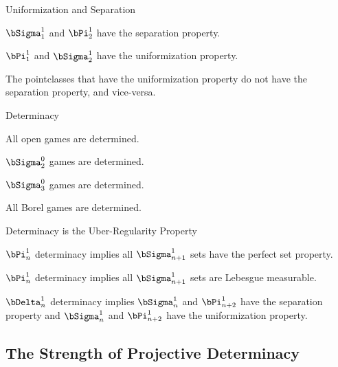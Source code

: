 \documentclass{beamer}
\begin{document}
\begin{frame}{Uniformization and Separation}

\begin{theorem}[Luzin, 1927]
$\bSigma^1_1$ and $\bPi^1_2$ have the separation property.
\end{theorem}


\begin{theorem}[Kondo, 1939]
$\bPi^1_1$ and $\bSigma^1_2$ have the uniformization property.
\end{theorem}

\begin{fact}
The pointclasses that have the uniformization property do not have the
separation property, and vice-versa.
\end{fact}

\end{frame}

\begin{frame}{Determinacy}

\begin{theorem}
All open games are determined.
\end{theorem}

\begin{theorem}[Wolf, 1955]
$\bSigma^0_2$ games are determined.
\end{theorem}

\begin{theorem}[Davis, 1964]
$\bSigma^0_3$ games are determined.
\end{theorem}

\begin{theorem}[Matin, 1975]
All Borel games are determined.
\end{theorem}

\end{frame}


\begin{frame}{Determinacy is the Uber-Regularity Property}

\begin{theorem}
$\bPi^1_n$ determinacy implies all $\bSigma^1_{n+1}$ sets have the perfect set
property.
\end{theorem}

\begin{theorem}
$\bPi^1_n$ determinacy implies all $\bSigma^1_{n+1}$ sets are Lebesgue measurable.
\end{theorem}

\begin{theorem}[Moschovakis, 1971]
$\bDelta^1_n$ determinacy implies $\bSigma^1_n$ and $\bPi^1_{n+2}$ have the separation property
and $\bSigma^1_n$ and $\bPi^1_{n+2}$ have the uniformization property.
\end{theorem}

\end{frame}



\subsection{The Strength of Projective Determinacy}
\end{document}
